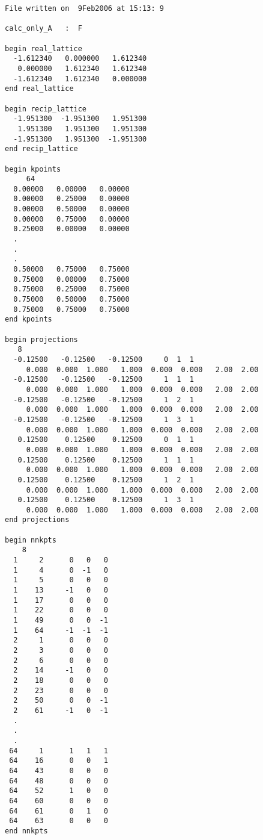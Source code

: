 \begin{verbatim}
File written on  9Feb2006 at 15:13: 9 

calc_only_A   :  F

begin real_lattice
  -1.612340   0.000000   1.612340
   0.000000   1.612340   1.612340
  -1.612340   1.612340   0.000000
end real_lattice

begin recip_lattice
  -1.951300  -1.951300   1.951300
   1.951300   1.951300   1.951300
  -1.951300   1.951300  -1.951300
end recip_lattice

begin kpoints
     64
  0.00000   0.00000   0.00000   
  0.00000   0.25000   0.00000   
  0.00000   0.50000   0.00000   
  0.00000   0.75000   0.00000   
  0.25000   0.00000   0.00000   
  .
  .
  .
  0.50000   0.75000   0.75000   
  0.75000   0.00000   0.75000   
  0.75000   0.25000   0.75000   
  0.75000   0.50000   0.75000   
  0.75000   0.75000   0.75000     
end kpoints

begin projections
   8
  -0.12500   -0.12500   -0.12500     0  1  1 
     0.000  0.000  1.000   1.000  0.000  0.000   2.00  2.00
  -0.12500   -0.12500   -0.12500     1  1  1 
     0.000  0.000  1.000   1.000  0.000  0.000   2.00  2.00
  -0.12500   -0.12500   -0.12500     1  2  1 
     0.000  0.000  1.000   1.000  0.000  0.000   2.00  2.00
  -0.12500   -0.12500   -0.12500     1  3  1 
     0.000  0.000  1.000   1.000  0.000  0.000   2.00  2.00
   0.12500    0.12500    0.12500     0  1  1 
     0.000  0.000  1.000   1.000  0.000  0.000   2.00  2.00
   0.12500    0.12500    0.12500     1  1  1 
     0.000  0.000  1.000   1.000  0.000  0.000   2.00  2.00
   0.12500    0.12500    0.12500     1  2  1 
     0.000  0.000  1.000   1.000  0.000  0.000   2.00  2.00
   0.12500    0.12500    0.12500     1  3  1 
     0.000  0.000  1.000   1.000  0.000  0.000   2.00  2.00
end projections

begin nnkpts
    8
  1     2      0   0   0
  1     4      0  -1   0
  1     5      0   0   0
  1    13     -1   0   0
  1    17      0   0   0
  1    22      0   0   0
  1    49      0   0  -1
  1    64     -1  -1  -1
  2     1      0   0   0
  2     3      0   0   0
  2     6      0   0   0
  2    14     -1   0   0
  2    18      0   0   0
  2    23      0   0   0
  2    50      0   0  -1
  2    61     -1   0  -1
  .
  .
  .
 64     1      1   1   1
 64    16      0   0   1
 64    43      0   0   0
 64    48      0   0   0
 64    52      1   0   0
 64    60      0   0   0
 64    61      0   1   0
 64    63      0   0   0
end nnkpts
\end{verbatim}


